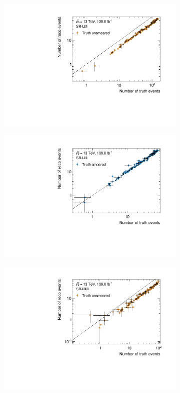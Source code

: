  \begin{figure}
	\centering
	\begin{subfigure}[b]{0.49\linewidth}
		\centering\includegraphics[width=\textwidth]{yields_SR-LM_unsmeared}
	\end{subfigure}\hfill
	\begin{subfigure}[b]{0.49\linewidth}
		\centering\includegraphics[width=\textwidth]{yields_SR-LM_smeared}
	\end{subfigure}\hfill
	\begin{subfigure}[b]{0.49\linewidth}
		\centering\includegraphics[width=\textwidth]{yields_SR-MM_unsmeared}

\end{subfigure}
\end{figure}
